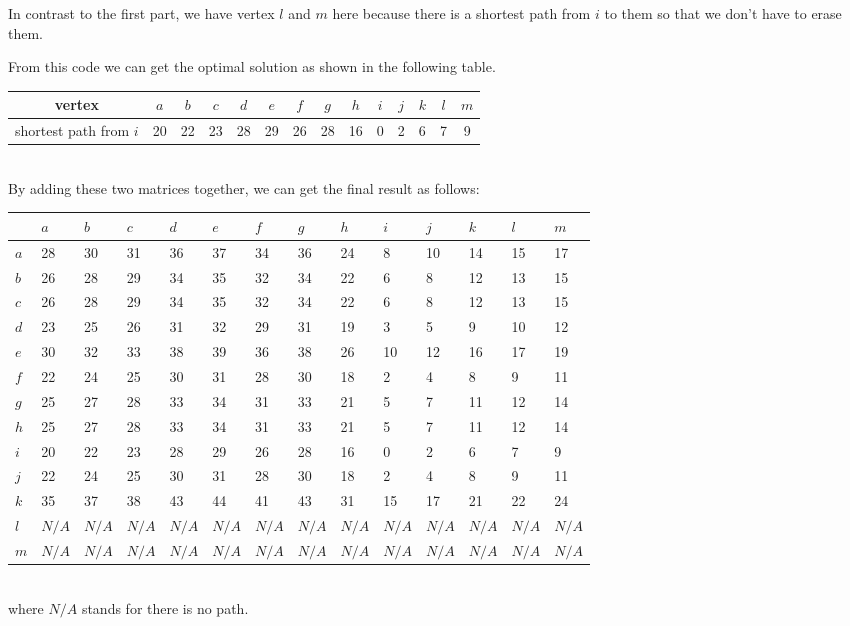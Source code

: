 \documentclass[11pt]{scrreprt}
\begin{document}
In contrast to the first part, we have vertex $l$ and $m$ here because there is a shortest path from $i$ to them so that we don't have to erase them.

From this code we can get the optimal solution as shown in the following table.\\
\begin{tabular}{|c|c|c|c|c|c|c|c|c|c|c|c|c|c|}
	\hline vertex & $a$   &  $b$ & $c$ & $d$ & $e$ & $f$ & $g$ & $h$ & $i$  & $j$ & $k$ & $l$ & $m$   \\
	\hline shortest path from $i$ & 20 & 22 & 23 & 28 & 29 & 26 & 28 & 16 & 0 & 2 & 6 & 7 & 9 \\
	\hline
\end{tabular} \\

By adding these two matrices together, we can get the final result as follows:\\
\begin{tabularx}{\textwidth}{|l|X|X|X|X|X|X|X|X|X|X|X|X|X|}

\hline  	& $a$ &  $b$ & $c$ & $d$ & $e$ & $f$ & $g$ & $h$ & $i$  & $j$ & $k$ & $l$ & $m$\\
\hline $a$ &	28 &	30 &	31 &	36 &	37 &	34 &	36 &	24 &	8 &	10 &	14 &	15 &	17\\
\hline $b$ &	26 &	28 &	29 &	34 &	35 &	32 &	34 &	22 &	6 &	8 &	12 &	13 &	15\\
\hline $c$ &	26 &	28 &	29 &	34 &	35 &	32 &	34 &	22 &	6 &	8 &	12 &	13 &	15\\
\hline $d$ &	23 &	25 &	26 &	31 &	32 &	29 &	31 &	19 &	3 &	5 &	9 &	10 &	12\\
\hline $e$ &	30 &	32 &	33 &	38 &	39 &	36 &	38 &	26 &	10 &	12 &	16 &	17 &	19\\
\hline $f$ &	22 &	24 &	25 &	30 &	31 &	28 &	30 &	18 &	2 &	4 &	8 &	9 &	11\\
\hline $g$ &	25 &	27 &	28 &	33 &	34 &	31 &	33 &	21 &	5 &	7 &	11 &	12 &	14\\
\hline $h$ &	25 &	27 &	28 &	33 &	34 &	31 &	33 &	21 &	5 &	7 &	11 &	12 &	14\\
\hline $i$ &	20 &	22 &	23 &	28 &	29 &	26 &	28 &	16 &	0 &	2 &	6 &	7 &	9\\
\hline $j$ &	22 &	24 &	25 &	30 &	31 &	28 &	30 &	18 &	2 &	4 &	8 &	9 &	11\\
\hline $k$ &	35 &	37 &	38 &	43 &	44 &	41 &	43 &	31 &	15 &	17 &	21 &	22 &	24\\
\hline $l$ &	$N/A$ &	$N/A$ &	$N/A$ &	$N/A$ &	$N/A$ &	$N/A$ &	$N/A$ &	$N/A$ &	$N/A$ &	$N/A$ &	$N/A$ &	$N/A$ &	$N/A$\\
\hline $m$ &	$N/A$ &	$N/A$ &	$N/A$ &	$N/A$ &	$N/A$ &	$N/A$ &	$N/A$ &	$N/A$ &	$N/A$ &	$N/A$ &	$N/A$ &	$N/A$ &	$N/A$\\
\hline
\end{tabularx} \\

where $N/A$ stands for there is no path.
\end{document}
